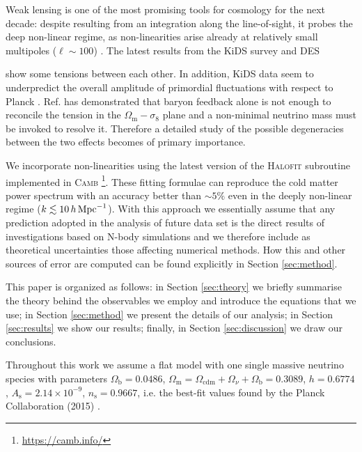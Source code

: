 \documentclass[a4paper,11pt]{article}
\def\kMpc{\, h \, {\rm Mpc}^{-1}}
\begin{document}
Weak lensing is one of the most promising tools for cosmology for the next decade: despite resulting from an integration along the line-of-sight, it probes the deep non-linear regime, as non-linearities arise already at relatively small multipoles ($\ell\sim 100$) \cite{Takada_WL+04}.
The latest results from the KiDS survey \cite{Koh-KiDS+17} and DES \cite{DES_lensing+17} {show some tensions between each other.
In addition, KiDS data seem to underpredict the overall amplitude of primordial fluctuations with respect to Planck \cite{Lensing_is_low+16, Problems_KiDS+17}.
Ref. \cite{McCarthy+17} has demonstrated that baryon feedback alone is not enough to reconcile the tension in the $\Omega_\mathrm{m}-\sigma_8$ plane and a non-minimal neutrino mass must be invoked to resolve it.
Therefore a detailed study of the possible degeneracies between the two effects becomes of primary importance.


We incorporate non-linearities using the latest version of the \textsc{Halofit} subroutine implemented in \textsc{Camb} \cite{Mead-b+15, Mead-nu+16}\footnote{\url{https://camb.info/}}.
These fitting formulae can reproduce the cold matter power spectrum with an accuracy better than $\sim5\%$ even in the deeply non-linear regime ($k\lesssim 10 \kMpc$).
With this approach we essentially assume that any prediction adopted in the analysis of future data set is the direct results of investigations based on N-body simulations and we therefore include as theoretical uncertainties those affecting numerical methods. 
How this and other sources of error are computed can be found explicitly in Section \ref{sec:method}.

This paper is organized as follows: in Section \ref{sec:theory} we briefly summarise the theory behind the observables we employ and introduce the equations that we use; in Section \ref{sec:method} we present the details of our analysis; in Section \ref{sec:results} we show our results; finally, in Section \ref{sec:discussion} we draw our conclusions.

Throughout this work we assume a flat \LCDM model with one single massive neutrino species with parameters $\Omega_\mathrm b = 0.0486$, $\Omega_\mathrm m = \Omega_\mathrm{cdm}+\Omega_\nu + \Omega_\mathrm b= 0.3089$, $h = 0.6774$, $A_\mathrm s = 2.14\times 10^{-9}$, $n_\mathrm s = 0.9667$, i.e. the best-fit values found by the Planck Collaboration (2015) \cite{Planck+15}.

}
\end{document}
